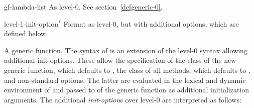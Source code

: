 \begin{optDefinition}
\label{generic-lambda-1}
%
\Syntax
{}
%
\begin{arguments}
    \item[gf-lambda-list] As level-0.  See section~\ref{defgeneric-0}.

    \item[level-1-init-option\/$^*$] Format as level-0, but with additional
    options, which are defined below.
\end{arguments}
%
\result%
A generic function.
%
\remarks%
The syntax of  is an extension of the level-0
syntax allowing additional init-options.  These allow the
specification of the class of the new generic function, which defaults
to , the class of all methods, which defaults
to , and non-standard options. The latter are evaluated
in the lexical and dynamic environment of  and
passed to  of the generic function as additional
initialization arguments.  The additional {\em init-option\/}s over
level-0 are interpreted as follows:
%
\begin{options}


\end{options}
\end{optDefinition}
